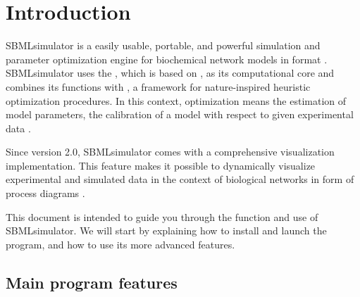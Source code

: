 \chapter{Introduction}


SBMLsimulator \citep{Doerr2014a} is a easily usable, portable, and powerful simulation and parameter optimization engine for biochemical network models in \SBML format \citep{M.Hucka03012003}.
SBMLsimulator uses the \SBSCL \citep{Keller2013}, which is based on \JSBML \citep{Draeger2011, Rodriguez2015}, as its computational core and combines its functions with \EvA \citep{Kron10EvA2}, a \Java framework for nature-inspired heuristic optimization procedures.
In this context, optimization means the estimation of model parameters, \ie the calibration of a model with respect to given experimental data \citep{Draeger2009a}.

Since version 2.0, SBMLsimulator comes with a comprehensive visualization implementation. 
This feature makes it possible to dynamically visualize experimental and simulated data in the context of biological networks in form of \SBGN process diagrams \citep{Rougny2019}.

This document is intended to guide you through the function and use of SBMLsimulator.
We will start by explaining how to install and launch the program, and how to use its more advanced features.

\section{Main program features}

